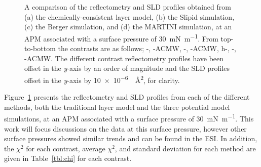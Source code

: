 \documentclass[amsmath,amssymb,twocolumn,superscriptaddress]{revtex4-1}
\begin{document}
\begin{figure}
 \caption{A comparison of the reflectometry and SLD profiles obtained from
 (a) the chemically-consistent layer model, (b) the Slipid simulation, (c) the Berger
 simulation, and (d) the MARTINI simulation, at an APM associated with a surface pressure of \SI{30}{\milli\newton\per\meter}. From top-to-bottom the contrasts are as
 follows; -, -ACMW, -,
 -ACMW, h-, -, -ACMW.
 The different contrast reflectometry profiles have been offset in the
 \emph{y}-axis by an order of magnitude and the SLD profiles offset in
 the \emph{y}-axis by \SI{10e-6}{\per\square\angstrom}, for clarity.}
 \label{fig:ref}
\end{figure}
%
Figure~\ref{fig:ref} presents the reflectometry and SLD profiles from each of the different methods, both the traditional layer model and the three potential model simulations, at an APM associated with a surface pressure of \SI{30}{\milli\newton\per\meter}.
This work will focus discussions on the data at this surface pressure, however other surface pressures showed similar trends and can be found in the ESI.
In addition, the $\chi^2$ for each contrast, average $\chi^2$, and standard deviation for each method are given in Table~\ref{tbl:chi} for each contrast.
%
\end{document}
